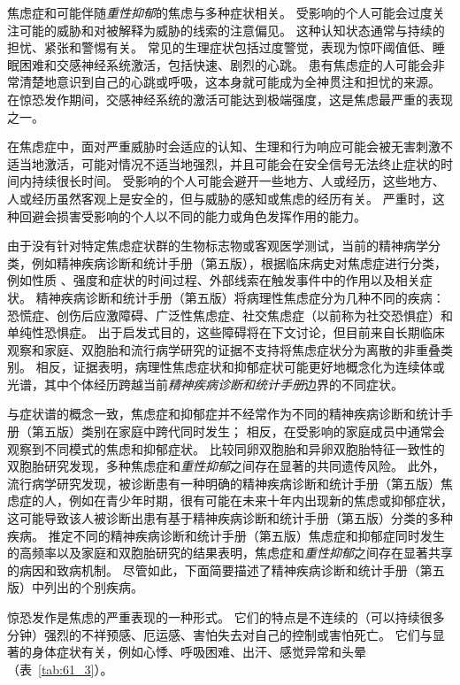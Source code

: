 焦虑症和可能伴随\textit{重性抑郁}的焦虑与多种症状相关。
受影响的个人可能会过度关注可能的威胁和对被解释为威胁的线索的注意偏见。
这种认知状态通常与持续的担忧、紧张和警惕有关。
常见的生理症状包括过度警觉，表现为惊吓阈值低、睡眠困难和交感神经系统激活，包括快速、剧烈的心跳。
患有焦虑症的人可能会非常清楚地意识到自己的心跳或呼吸，这本身就可能成为全神贯注和担忧的来源。
在惊恐发作期间，交感神经系统的激活可能达到极端强度，这是焦虑最严重的表现之一。


在焦虑症中，面对严重威胁时会适应的认知、生理和行为响应可能会被无害刺激不适当地激活，可能对情况不适当地强烈，并且可能会在安全信号无法终止症状的时间内持续很长时间。
受影响的个人可能会避开一些地方、人或经历，这些地方、人或经历虽然客观上是安全的，但与威胁的感知或焦虑的经历有关。
严重时，这种回避会损害受影响的个人以不同的能力或角色发挥作用的能力。


由于没有针对特定焦虑症状群的生物标志物或客观医学测试，当前的精神病学分类，例如精神疾病诊断和统计手册（第五版），根据临床病史对焦虑症进行分类，例如性质 、强度和症状的时间过程、外部线索在触发事件中的作用以及相关症状。
精神疾病诊断和统计手册（第五版）将病理性焦虑症分为几种不同的疾病：恐慌症、创伤后应激障碍、广泛性焦虑症、社交焦虑症（以前称为社交恐惧症）和单纯性恐惧症。
出于启发式目的，这些障碍将在下文讨论，但目前来自长期临床观察和家庭、双胞胎和流行病学研究的证据不支持将焦虑症状分为离散的非重叠类别。
相反，证据表明，病理性焦虑症状和抑郁症状可能更好地概念化为连续体或光谱，其中个体经历跨越当前\textit{精神疾病诊断和统计手册}边界的不同症状。


与症状谱的概念一致，焦虑症和抑郁症并不经常作为不同的精神疾病诊断和统计手册（第五版）类别在家庭中跨代同时发生；
相反，在受影响的家庭成员中通常会观察到不同模式的焦虑和抑郁症状。
比较同卵双胞胎和异卵双胞胎特征一致性的双胞胎研究发现，多种焦虑症和\textit{重性抑郁}之间存在显著的共同遗传风险。
此外，流行病学研究发现，被诊断患有一种明确的精神疾病诊断和统计手册（第五版）焦虑症的人，例如在青少年时期，很有可能在未来十年内出现新的焦虑或抑郁症状，这可能导致该人被诊断出患有基于精神疾病诊断和统计手册（第五版）分类的多种疾病。
推定不同的精神疾病诊断和统计手册（第五版）焦虑症和抑郁症同时发生的高频率以及家庭和双胞胎研究的结果表明，焦虑症和\textit{重性抑郁}之间存在显著共享的病因和致病机制。
尽管如此，下面简要描述了精神疾病诊断和统计手册（第五版）中列出的个别疾病。


惊恐发作是焦虑的严重表现的一种形式。
它们的特点是不连续的（可以持续很多分钟）强烈的不祥预感、厄运感、害怕失去对自己的控制或害怕死亡。
它们与显著的身体症状有关，例如心悸、呼吸困难、出汗、感觉异常和头晕（表~\ref{tab:61_3}）。


